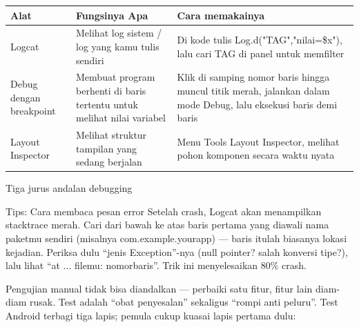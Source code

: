 


\begin{center}
\begin{tabularx}{\linewidth}{|X|X|X|}
\hline
\textbf{Alat} & \textbf{Fungsinya Apa} & \textbf{Cara memakainya} \tabularnewline
\hline
Logcat & Melihat log sistem / log yang kamu tulis sendiri & Di kode tulis Log.d("TAG","nilai=\$x"), lalu cari TAG di panel untuk memfilter \tabularnewline
Debug dengan breakpoint & Membuat program berhenti di baris tertentu untuk melihat nilai variabel & Klik di samping nomor baris hingga muncul titik merah, jalankan dalam mode Debug, lalu eksekusi baris demi baris \tabularnewline
Layout Inspector & Melihat struktur tampilan yang sedang berjalan & Menu Tools Layout Inspector, melihat pohon komponen secara waktu nyata \tabularnewline
\hline
\end{tabularx}
\end{center}

\begin{center}\small\color{gray}Tiga jurus andalan debugging\end{center}

\begin{tcbinfo}{Tips: Cara membaca pesan error}
Setelah crash, Logcat akan menampilkan stacktrace merah. Cari dari bawah ke atas baris pertama yang diawali nama paketmu sendiri (misalnya com.example.yourapp) — baris itulah biasanya lokasi kejadian. Periksa dulu “jenis Exception”-nya (null pointer? salah konversi tipe?), lalu lihat “at ... filemu: nomorbaris”. Trik ini menyelesaikan 80\% crash.

\end{tcbinfo}


Pengujian manual tidak bisa diandalkan — perbaiki satu fitur, fitur lain diam-diam rusak. Test adalah “obat penyesalan” sekaligus “rompi anti peluru”. Test Android terbagi tiga lapis; pemula cukup kuasai lapis pertama dulu:

